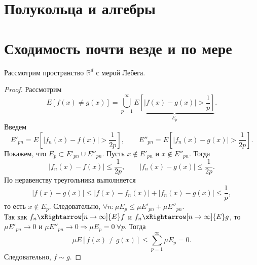 \documentclass[12pt,a4paper]{report}
\begin{document}
\section{Полукольца и алгебры}


\section{Сходимость почти везде и по мере}

Рассмотрим пространство $\mathbb R^d$ с мерой Лебега.




\begin{proof}
    Рассмотрим
    \[
    E[f(x)\neq g(x)]=\bigcup_{p=1}^{\infty}\underbrace{E\left[|f(x)-g(x)|>\frac{1}{p}\right]}_{E_p}.
    \]
    Введем
    \[
    E'_{pn}=E\left[|f_n(x)-f(x)|>\frac{1}{2p}\right], \qquad
    E''_{pn}=E\left[|f_n(x)-g(x)|>\frac{1}{2p}\right].
    \]
    Покажем, что $E_p\subset E'_{pn}\cup E''_{pn}$. Пусть $x\notin E'_{pn}$ и $x\notin E''_{pn}$. Тогда
    \[
    |f_n(x)-f(x)|\leq\frac{1}{2p}, \qquad |f_n(x)-g(x)|\leq\frac{1}{2p}.
    \]
    По неравенству треугольника выполняется
    \[
    |f(x)-g(x)|\leq|f(x)-f_n(x)|+|f_n(x)-g(x)|\leq\frac{1}{p},
    \]
    то есть $x\notin E_p$. Следовательно, $\forall n \colon \mu E_p\leq\mu E'_{pn}+\mu E''_{pn}$. \\
    Так как $f_n\xRightarrow[n\to\infty]{E}f$ и $f_n\xRightarrow[n\to\infty]{E}g$, то $\mu E'_{pn}\to0$ и $\mu E''_{pn}\to0 \Rightarrow \mu E_p=0 \ \forall p$. Тогда
    \[
    \mu E[f(x)\neq g(x)]\leq\sum_{p=1}^{\infty}\mu E_p=0.
    \]
    Следовательно, $f\sim g$.
\end{proof}

\end{document}

